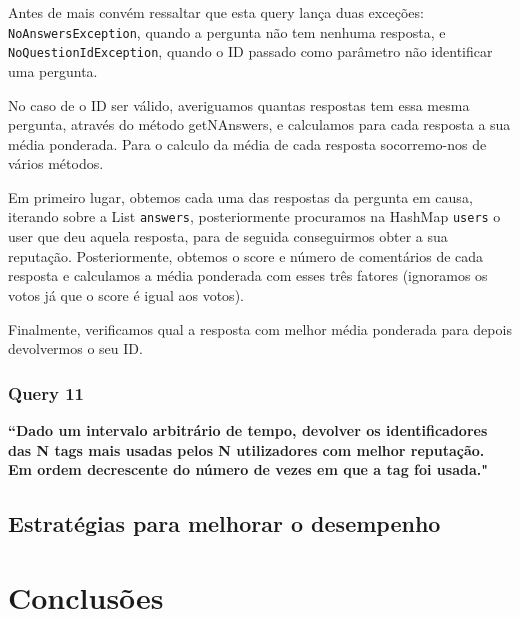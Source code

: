 \documentclass[a4paper]{article}
\begin{document}
\vspace{0.1cm}

Antes de mais convém ressaltar que esta query lança duas exceções:
\texttt{NoAnswersException}, quando a pergunta não tem nenhuma resposta, e
\texttt{NoQuestionIdException}, quando o ID passado como parâmetro não identificar
uma pergunta.\par
No caso de o ID ser válido, averiguamos quantas respostas tem essa mesma pergunta,
através do método getNAnswers, e calculamos para cada resposta a sua média ponderada.
Para o calculo da média de cada resposta socorremo-nos de vários métodos.\par
Em primeiro lugar, obtemos cada uma das respostas da pergunta em causa, iterando
sobre a List \texttt{answers}, posteriormente procuramos na HashMap \texttt{users}
o user que deu aquela resposta, para de seguida conseguirmos obter a sua reputação.
Posteriormente, obtemos o score e número de comentários de cada resposta e calculamos
a média ponderada com esses três fatores (ignoramos os votos já que o score é
igual aos votos).\par
Finalmente, verificamos qual a resposta com melhor média ponderada para depois
devolvermos o seu ID.





\subsubsection*{Query 11}
\label{sec:query11}

\textbf{“Dado um intervalo arbitrário de tempo, devolver os identificadores das N tags
mais usadas pelos N utilizadores com melhor reputação. Em ordem decrescente do número
de vezes em que a tag foi usada."}

\vspace{0.1cm}

\subsection{Estratégias para melhorar o desempenho}
\label{sec:desempenho}






\section{Conclusões}
\label{sec:conclusao}
\end{document}
